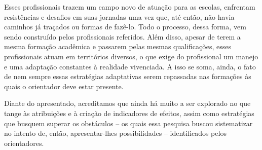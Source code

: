 \documentclass[
  letterpaper,
  DIV=11,
  numbers=noendperiod,
  oneside]{scrreprt}
\begin{document}
Esses profissionais trazem um campo novo de atuação para as escolas,
enfrentam resistências e desafios em suas jornadas uma vez que, até
então, não havia caminhos já traçados ou formas de fazê-lo. Todo o
processo, dessa forma, vem sendo construído pelos profissionais
referidos. Além disso, apesar de terem a mesma formação acadêmica e
passarem pelas mesmas qualificações, esses profissionais atuam em
territórios diversos, o que exige do profissional um manejo e uma
adaptação constantes à realidade vivenciada. A isso se soma, ainda, o
fato de nem sempre essas estratégias adaptativas serem repassadas nas
formações às quais o orientador deve estar presente.

Diante do apresentado, acreditamos que ainda há muito a ser explorado no
que tange às atribuições e à criação de indicadores de efeitos, assim
como estratégias que busquem superar os obstáculos -- os quais essa
pesquisa buscou sistematizar no intento de, então, apresentar-lhes
possibilidades -- identificados pelos orientadores.
\end{document}
